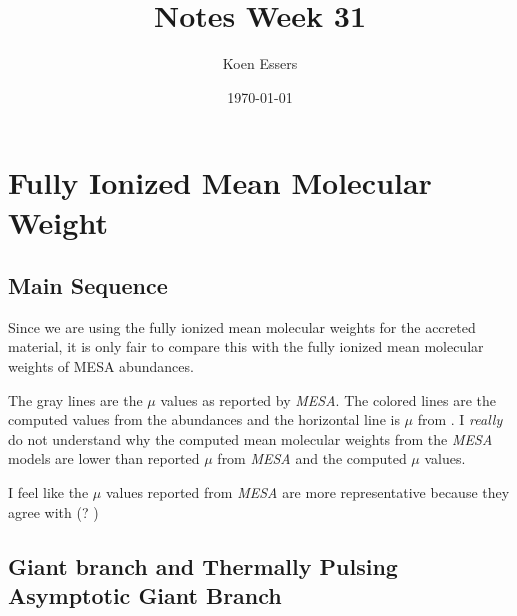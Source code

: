\documentclass[a4paper,10pt]{article}
\title{Notes Week 31}
\author{Koen Essers}
\date{\today}
\begin{document}
\setuplayout
\section{Fully Ionized Mean Molecular Weight}

\subsection{Main Sequence}

Since we are using the fully ionized mean molecular weights for the accreted material, it is only fair to compare this with the
fully ionized mean molecular weights of MESA abundances.

\begin{figure}[ht]
	\centering
\end{figure}

The gray lines are the \(\mu \) values as reported by \emph{MESA}.
The colored lines are the
computed values from the abundances and the horizontal line is \(\mu \) from \citet{asplund2009}.
I \emph{really} do not understand why the computed mean molecular weights from the \emph{MESA}
models are lower than reported \(\mu \) from \emph{MESA} and the computed \citet{asplund2009} \(\mu \)
values.

I feel like the \(\mu \) values reported from \emph{MESA} are more representative because they
agree with \citet{asplund2009}(?
)

\subsection{Giant branch and Thermally Pulsing Asymptotic Giant Branch}

\begin{figure}[ht]
	\centering
\end{figure}

\begin{figure}[ht]
	\centering
\end{figure}

\end{document}
